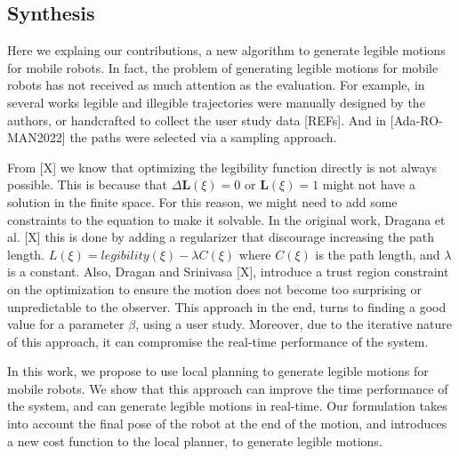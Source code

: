     \noindent
    \subsection{Synthesis} %
    Here we explaing our contributions, a new algorithm to generate legible motions for mobile robots.
    In fact, the problem of generating legible motions for mobile robots has not received as much attention as the evaluation.
    For example, in several works legible and illegible trajectories were manually designed by the authors,
    or handcrafted to collect the user study data [REFs].
    And in [Ada-RO-MAN2022] the paths were selected via a sampling approach.

    From [X] we know that optimizing the legibility function directly is not always possible.
    This is because that $\Delta \mathbf{L}(\xi) = 0$ or $\mathbf{L}(\xi) = 1$ might not have a solution in the finite space.
    For this reason, we might need to add some constraints to the equation to make it solvable.
    In the original work, Dragana et al. [X] this is done by adding a regularizer that discourage increasing the path length.
    $L(\xi) = legibility(\xi) - \lambda C(\xi)$
    where $C(\xi)$ is the path length, and $\lambda$ is a constant.
    Also, Dragan and Srinivasa [X], introduce a trust region constraint on the optimization
     to ensure the motion does not become too surprising or unpredictable to the observer.
    This approach in the end, turns to finding a good value for a parameter $\beta$, using a user study.
    Moreover, due to the iterative nature of this approach, it can compromise the real-time performance of the system.

    In this work, we propose to use local planning to generate legible motions for mobile robots.
    We show that this approach can improve the time performance of the system, and can generate legible motions in real-time.
    Our formulation takes into account the final pose of the robot at the end of the motion,
    and introduces a new cost function to the local planner, to generate legible motions.


